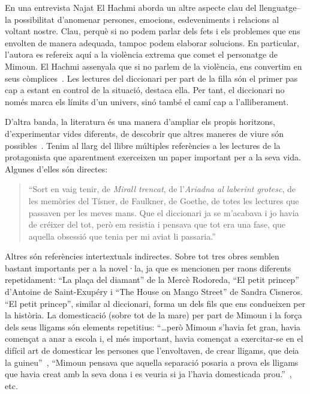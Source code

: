 En una entrevista Najat El Hachmi aborda un altre aspecte clau del llenguatge--la possibilitat d'anomenar persones, emocions, esdeveniments i relacions al voltant nostre.
Clau, perquè si no podem parlar dels fets i els problemes que ens envolten de manera adequada, tampoc podem elaborar solucions.
En particular, l'autora es refereix aquí a la violència extrema que comet el personatge de Mimoun.
El Hachmi assenyala que si no parlem de la violència, ens convertim en seus còmplices~\autocite{HaAM2011}.
Les lectures del diccionari per part de la filla són el primer pas cap a estant en control de la situació, destaca ella.
Per tant, el diccionari no només marca els límits d'un univers, sinó també el camí cap a l'alliberament.

D'altra banda, la literatura és una manera d'ampliar els propis horitzons, d'experimentar vides diferents, de descobrir que altres maneres de viure són possibles~\autocite{HaAM2011}.
Tenim al llarg del llibre múltiples referències a les lectures de la protagonista que aparentment exerceixen un paper important per a la seva vida.
Algunes d'elles són directes:
\begin{quote}
  ``Sort en vaig tenir, de \textit{Mirall trencat}, de l'\textit{Ariadna al laberint grotesc}, de les memòries del Tísner, de Faulkner, de Goethe, de totes les lectures que passaven per les meves mans. Que el diccionari ja se m'acabava i jo havia de créixer del tot, però em resistia i pensava que tot era una fase, que aquella obsessió que tenia per mi aviat li passaria.''~\autocite[286]{ElHachmi2008}
\end{quote}

Altres són referències intertextuals indirectes.
Sobre tot tres obres semblen bastant importants per a la novel·la, ja que es mencionen per raons diferents repetidament: ``La plaça del diamant'' de la Mercè Rodoreda, ``El petit princep'' d'Antoine de Saint-Exupéry i ``The House on Mango Street'' de Sandra Cisneros.
``El petit princep'', similar al diccionari, forma un dels fils que ens condueixen per la història.
La domesticació (sobre tot de la mare) per part de Mimoun i la força dels seus lligams són elements repetitius:
``\ldots però Mimoun s'havia fet gran, havia començat a anar a escola i, el més important, havia començat a exercitar-se en el difícil art de domesticar les persones que l'envoltaven, de crear lligams, que deia la guineu''~\autocite[24]{ElHachmi2008},
``Mimoun pensava que aquella separació posaria a prova els lligams que havia creat amb la seva dona i es veuria si ja l'havia domesticada prou.''~\autocite[124]{ElHachmi2008}, etc.

